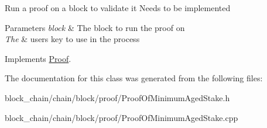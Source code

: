Run a proof on a block to validate it Needs to be implemented


\begin{DoxyParams}{Parameters}
{\em block} & The block to run the proof on \\
\hline
{\em The} & user\textquotesingle{}s key to use in the process \\
\hline
\end{DoxyParams}


Implements \mbox{\hyperlink{classProof_a6ab9f6c3f603447e3a9c7c932b5deac4}{Proof}}.



The documentation for this class was generated from the following files\+:\begin{DoxyCompactItemize}
\item 
block\+\_\+chain/chain/block/proof/Proof\+Of\+Minimum\+Aged\+Stake.\+h\item 
block\+\_\+chain/chain/block/proof/Proof\+Of\+Minimum\+Aged\+Stake.\+cpp\end{DoxyCompactItemize}
